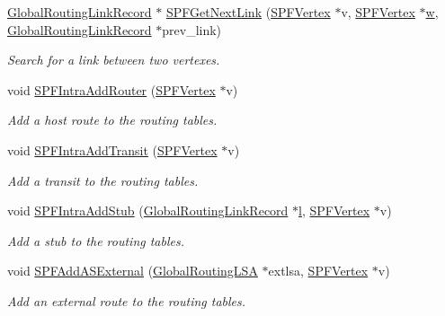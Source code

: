 \begin{DoxyCompactItemize}
\hyperlink{classns3_1_1GlobalRoutingLinkRecord}{Global\+Routing\+Link\+Record} $\ast$ \hyperlink{classns3_1_1GlobalRouteManagerImpl_a4c868c90e06e063ac2eb60cfe93c2c84}{S\+P\+F\+Get\+Next\+Link} (\hyperlink{classns3_1_1SPFVertex}{S\+P\+F\+Vertex} $\ast$v, \hyperlink{classns3_1_1SPFVertex}{S\+P\+F\+Vertex} $\ast$\hyperlink{mmwave_2model_2fading-traces_2fading__trace__generator_8m_afd61ec66f9d7b807eece6eb12c781844}{w}, \hyperlink{classns3_1_1GlobalRoutingLinkRecord}{Global\+Routing\+Link\+Record} $\ast$prev\+\_\+link)
\begin{DoxyCompactList}\small\item\em Search for a link between two vertexes. \end{DoxyCompactList}\item 
void \hyperlink{classns3_1_1GlobalRouteManagerImpl_adc0725b441a01d02bc4db842771a36d5}{S\+P\+F\+Intra\+Add\+Router} (\hyperlink{classns3_1_1SPFVertex}{S\+P\+F\+Vertex} $\ast$v)
\begin{DoxyCompactList}\small\item\em Add a host route to the routing tables. \end{DoxyCompactList}\item 
void \hyperlink{classns3_1_1GlobalRouteManagerImpl_aaafd698f94e453e3fe41f08bd62867be}{S\+P\+F\+Intra\+Add\+Transit} (\hyperlink{classns3_1_1SPFVertex}{S\+P\+F\+Vertex} $\ast$v)
\begin{DoxyCompactList}\small\item\em Add a transit to the routing tables. \end{DoxyCompactList}\item 
void \hyperlink{classns3_1_1GlobalRouteManagerImpl_ac939f5c304a02470c566b99699db402c}{S\+P\+F\+Intra\+Add\+Stub} (\hyperlink{classns3_1_1GlobalRoutingLinkRecord}{Global\+Routing\+Link\+Record} $\ast$\hyperlink{lte__pathloss_8m_a5b54c0a045f179bcbbbc9abcb8b5cd4c}{l}, \hyperlink{classns3_1_1SPFVertex}{S\+P\+F\+Vertex} $\ast$v)
\begin{DoxyCompactList}\small\item\em Add a stub to the routing tables. \end{DoxyCompactList}\item 
void \hyperlink{classns3_1_1GlobalRouteManagerImpl_a0ccd93a5b90948571d2b762d4219c65d}{S\+P\+F\+Add\+A\+S\+External} (\hyperlink{classns3_1_1GlobalRoutingLSA}{Global\+Routing\+L\+SA} $\ast$extlsa, \hyperlink{classns3_1_1SPFVertex}{S\+P\+F\+Vertex} $\ast$v)
\begin{DoxyCompactList}\small\item\em Add an external route to the routing tables. \end{DoxyCompactList}\item 

\end{DoxyCompactItemize}
